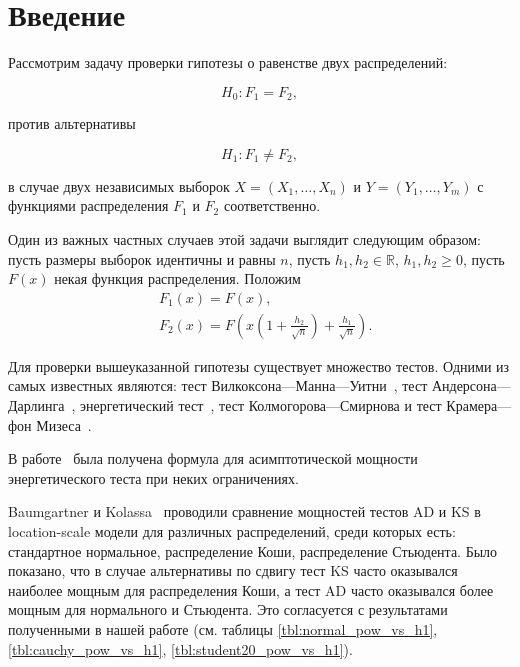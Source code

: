 \documentclass[12pt]{article}
\theoremstyle{break}
\begin{document}
\newpage

\tableofcontents

\newpage
\section{Введение}
Рассмотрим задачу проверки гипотезы о равенстве двух
распределений:

\begin{equation*}
	H_0: F_1 = F_2,
\end{equation*}

\noindent против альтернативы

\begin{equation*}
	H_1: F_1 \neq F_2,
\end{equation*}


\noindent в случае двух независимых выборок $X = (X_1, \ldots,X_n)$ и $Y = (Y_1, \ldots, Y_m)$ с функциями распределения $F_1$ и $F_2$ соответственно.


Один из важных частных случаев этой задачи выглядит следующим образом:
пусть размеры выборок идентичны и равны $n$, пусть $h_1, h_2 \in \mathbb{R}$, $h_1, h_2 \geqslant 0$, пусть $F(x)$ некая функция распределения. Положим
\begin{align}
	&F_1(x) = F(x), \label{eq:F1}\\
	&F_2(x) = F\left(x\left(1 + \frac{h_2}{\sqrt{n}}\right) +  \frac{h_1}{\sqrt{n}}\right). \label{eq:F2}
\end{align}

Для проверки вышеуказанной гипотезы существует множество тестов. Одними из самых известных являются: тест Вилкоксона---Манна---Уитни~\cite{WMW_article}, тест Андерсона---Дарлинга~\cite{AD_article}, энергетический тест~\cite{ET_article}, тест Колмогорова---Смирнова и тест Крамера---фон Мизеса~\cite{KS_CM_article}.

В работе~\cite{melas2024} была получена формула для асимптотической мощности энергетического теста при неких ограничениях. 

Baumgartner и Kolassa~\cite{Baumgartner03072023} проводили сравнение мощностей тестов AD и KS в location-scale модели для различных распределений, среди которых есть: стандартное нормальное, распределение Коши, распределение Стьюдента. Было показано, что в случае альтернативы по сдвигу тест KS часто оказывался наиболее мощным для распределения Коши, а тест AD часто оказывался более мощным для нормального и Стьюдента. Это согласуется с результатами полученными в нашей работе (см. таблицы \ref{tbl:normal_pow_vs_h1}, \ref{tbl:cauchy_pow_vs_h1}, \ref{tbl:student20_pow_vs_h1}). 
\end{document}
